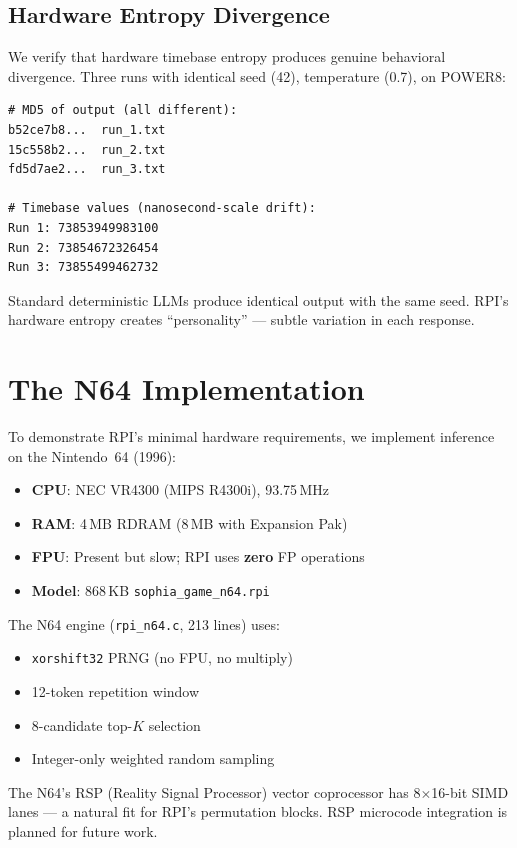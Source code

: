 \documentclass[10pt,twocolumn]{article}
\begin{document}
\subsection{Hardware Entropy Divergence}

We verify that hardware timebase entropy produces genuine behavioral divergence. Three runs with identical seed (42), temperature (0.7), on POWER8:

\begin{lstlisting}
# MD5 of output (all different):
b52ce7b8...  run_1.txt
15c558b2...  run_2.txt
fd5d7ae2...  run_3.txt

# Timebase values (nanosecond-scale drift):
Run 1: 73853949983100
Run 2: 73854672326454
Run 3: 73855499462732
\end{lstlisting}

Standard deterministic LLMs produce identical output with the same seed. RPI's hardware entropy creates ``personality'' --- subtle variation in each response.

\section{The N64 Implementation}
\label{sec:n64}

To demonstrate RPI's minimal hardware requirements, we implement inference on the Nintendo~64 (1996):

\begin{itemize}
\item \textbf{CPU}: NEC VR4300 (MIPS R4300i), 93.75\,MHz
\item \textbf{RAM}: 4\,MB RDRAM (8\,MB with Expansion Pak)
\item \textbf{FPU}: Present but slow; RPI uses \textbf{zero} FP operations
\item \textbf{Model}: 868\,KB \texttt{sophia\_game\_n64.rpi}
\end{itemize}

The N64 engine (\texttt{rpi\_n64.c}, 213 lines) uses:
\begin{itemize}
\item \texttt{xorshift32} PRNG (no FPU, no multiply)
\item 12-token repetition window
\item 8-candidate top-$K$ selection
\item Integer-only weighted random sampling
\end{itemize}

The N64's RSP (Reality Signal Processor) vector coprocessor has 8$\times$16-bit SIMD lanes --- a natural fit for RPI's permutation blocks. RSP microcode integration is planned for future work.
\end{document}
